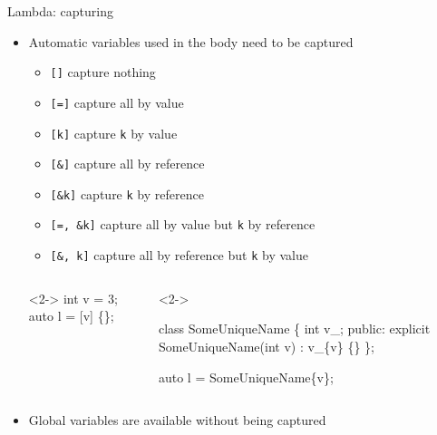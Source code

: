 \begin{frame}[fragile]{Lambda: capturing}

  \begin{itemize}
  \item Automatic variables used in the body need to be captured
    \begin{itemize}
    \item \texttt{[]} capture nothing
    \item \texttt{[=]} capture all by value
    \item \texttt{[k]} capture \texttt{k} by value
    \item \texttt{[\&]} capture all by reference
    \item \texttt{[\&k]} capture \texttt{k} by reference
    \item \texttt{[=, \&k]} capture all by value but \texttt{k} by reference
    \item \texttt{[\&, k]} capture all by reference but \texttt{k} by value
    \end{itemize}

    \begin{columns}[t]
      \begin{column}{.5\textwidth}
        \begin{codeblock}<2->{
int v = 3;
auto l = [v] \{\};}\end{codeblock}
      \end{column}

      \begin{column}{.5\textwidth}
        \begin{codeblock}<2->{
class SomeUniqueName \{
  int v\_;
 public:
  explicit SomeUniqueName(int v)
    : v\_\{v\} \{\}
  \ddd
\};

auto l = SomeUniqueName\{v\};}\end{codeblock}
      \end{column}
    \end{columns}
  \item<4-> Global variables are available without being captured
  \end{itemize}
\end{frame}

